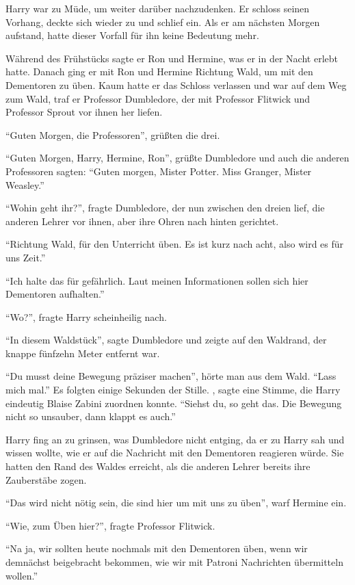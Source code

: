 Harry war zu Müde, um weiter darüber nachzudenken. Er schloss seinen Vorhang, deckte sich wieder zu und schlief ein. Als er am nächsten Morgen aufstand, hatte dieser Vorfall für ihn keine Bedeutung mehr.

Während des Frühstücks sagte er Ron und Hermine, was er in der Nacht erlebt hatte. Danach ging er mit Ron und Hermine Richtung Wald, um mit den Dementoren zu üben. Kaum hatte er das Schloss verlassen und war auf dem Weg zum Wald, traf er Professor Dumbledore, der mit Professor Flitwick und Professor Sprout vor ihnen her liefen.

\enquote{Guten Morgen, die Professoren}, grüßten die drei.

\enquote{Guten Morgen, Harry, Hermine, Ron}, grüßte Dumbledore und auch die anderen Professoren sagten: \enquote{Guten morgen, Mister Potter. Miss Granger, Mister Weasley.}

\enquote{Wohin geht ihr?}, fragte Dumbledore, der nun zwischen den dreien lief, die anderen Lehrer vor ihnen, aber ihre Ohren nach hinten gerichtet.

\enquote{Richtung Wald, für den Unterricht üben. Es ist kurz nach acht, also wird es für uns Zeit.}

\enquote{Ich halte das für gefährlich. Laut meinen Informationen sollen sich hier Dementoren aufhalten.}

\enquote{Wo?}, fragte Harry scheinheilig nach.

\enquote{In diesem Waldstück}, sagte Dumbledore und zeigte auf den Waldrand, der knappe fünfzehn Meter entfernt war.

\enquote{Du musst deine Bewegung präziser machen}, hörte man aus dem Wald. \enquote{Lass mich mal.} Es folgten einige Sekunden der Stille. , sagte eine Stimme, die Harry eindeutig Blaise Zabini zuordnen konnte. \enquote{Siehst du, so geht das. Die Bewegung nicht so unsauber, dann klappt es auch.}

Harry fing an zu grinsen, was Dumbledore nicht entging, da er zu Harry sah und wissen wollte, wie er auf die Nachricht mit den Dementoren reagieren würde. Sie hatten den Rand des Waldes erreicht, als die anderen Lehrer bereits ihre Zauberstäbe zogen.

\enquote{Das wird nicht nötig sein, die sind hier um mit uns zu üben}, warf Hermine ein.

\enquote{Wie, zum Üben hier?}, fragte Professor Flitwick.

\enquote{Na ja, wir sollten heute nochmals mit den Dementoren üben, wenn wir demnächst beigebracht bekommen, wie wir mit Patroni Nachrichten übermitteln wollen.}

